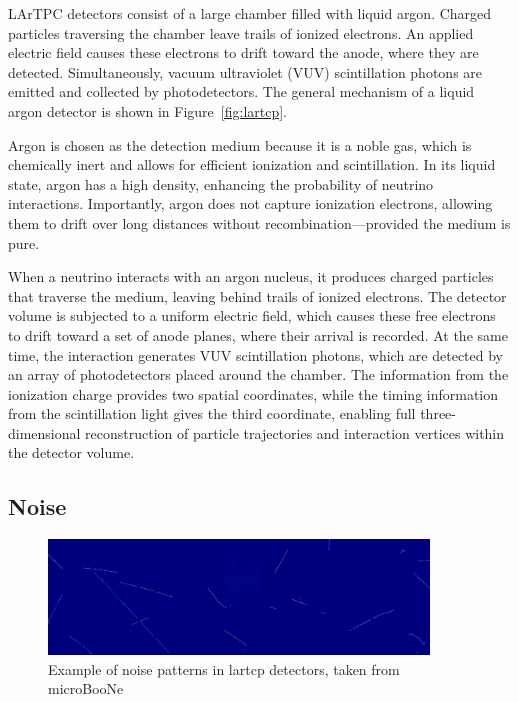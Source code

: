 \documentclass{pracalicmgr}
\begin{document}
LArTPC detectors consist of a large chamber filled with liquid argon. Charged particles traversing the chamber leave trails of ionized electrons. An applied electric field causes these electrons to drift toward the anode, where they are detected. Simultaneously, vacuum ultraviolet (VUV) scintillation photons are emitted and collected by photodetectors. The general mechanism of a liquid argon detector is shown in Figure~\ref{fig:lartcp}.

Argon is chosen as the detection medium because it is a noble gas, which is chemically inert and allows for efficient ionization and scintillation. In its liquid state, argon has a high density, enhancing the probability of neutrino interactions. Importantly, argon does not capture ionization electrons, allowing them to drift over long distances without recombination—provided the medium is pure.

When a neutrino interacts with an argon nucleus, it produces charged particles that traverse the medium, leaving behind trails of ionized electrons. The detector volume is subjected to a uniform electric field, which causes these free electrons to drift toward a set of anode planes, where their arrival is recorded. At the same time, the interaction generates VUV scintillation photons, which are detected by an array of photodetectors placed around the chamber. The information from the ionization charge provides two spatial coordinates, while the timing information from the scintillation light gives the third coordinate, enabling full three-dimensional reconstruction of particle trajectories and interaction vertices within the detector volume.

\subsection{Noise}

\begin{figure}[H]
    \centering
    \includegraphics[width=0.9\textwidth]{src/wireimageIM.png}
    \caption{Example of noise patterns in lartcp detectors, taken from microBooNe}
    \label{fig:noise}
\end{figure}
\end{document}
